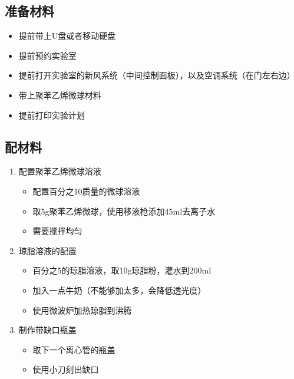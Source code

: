 \documentclass[12pt]{article}
\begin{document}
\subsection{准备材料}
\begin{itemize}
    \item 提前带上U盘或者移动硬盘
    \item 提前预约实验室
    \item 提前打开实验室的新风系统（中间控制面板），以及空调系统（在门左右边）
    \item 带上聚苯乙烯微球材料
    \item 提前打印实验计划
\end{itemize}

\subsection{配材料}
\begin{enumerate}
    \item 配置聚苯乙烯微球溶液
    \begin{itemize}
        \item 配置百分之10质量的微球溶液
        \item 取5g聚苯乙烯微球，使用移液枪添加45ml去离子水
        \item 需要搅拌均匀
    \end{itemize}

    \item 琼脂溶液的配置
    \begin{itemize}
        \item 百分之5的琼脂溶液，取10g琼脂粉，灌水到200ml
        \item 加入一点牛奶（不能够加太多，会降低透光度）
        \item 使用微波炉加热琼脂到沸腾
    \end{itemize}

    \item 制作带缺口瓶盖
    \begin{itemize}
        \item 取下一个离心管的瓶盖
        \item 使用小刀刻出缺口
    \end{itemize}
\end{enumerate}
\end{document}
